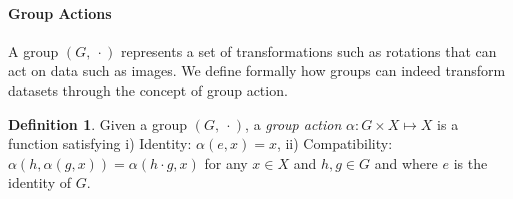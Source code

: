 \documentclass{article}
\theoremstyle{plain}
\theoremstyle{definition}
\newtheorem{definition}[theorem]{Definition}
\theoremstyle{remark}
\begin{document}
\paragraph{Group Actions} A group $(G,\ \cdot)$ represents a set of transformations such as rotations that can act on data such as images.%
We define formally how groups can indeed transform datasets through the concept of group action.
\begin{definition}\label{def:groupaction}
    Given a group $(G,\ \cdot)$, a \emph{group action} $\alpha:G\times X\mapsto X$ is a function satisfying i) Identity: $\alpha(e, x)=x$, ii) Compatibility: $\alpha(h,\alpha(g,x))=\alpha(h\cdot g, x)$ for any $x \in X$ and $h, g \in G$ and where $e$ is the identity of $G$.
\end{definition}

\end{document}
